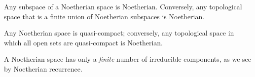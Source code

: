 \begin{env}[2.2.3]
\label{0.2.2.3}
Any subspace of a Noetherian space is Noetherian.
Conversely, any topological space that is a finite union of Noetherian subspaces is Noetherian.
\end{env}

\begin{env}[2.2.4]
\label{0.2.2.4}
Any Noetherian space is quasi-compact; conversely, any topological space in which all open sets are quasi-compact is Noetherian.
\end{env}

\begin{env}[2.2.5]
\label{0.2.2.5}
A Noetherian space has only a \emph{finite} number of irreducible components, as we see by Noetherian recurrence.
\end{env}
